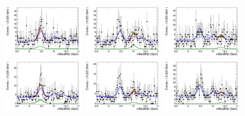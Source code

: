 \begin{figure}[!htbp]
\begin{center}
 \includegraphics[width=0.3\textwidth]{figures/modeling_xchecks/plots/ZToUpsilon1SPhoton_Cat0_signalStrenght_20/Cat0_mMuMNU_fit_s}
\includegraphics[width=0.3\textwidth]{figures/modeling_xchecks/plots/ZToUpsilon2SPhoton_Cat0_signalStrenght_20/Cat0_mMuMNU_fit_s}
\includegraphics[width=0.3\textwidth]{figures/modeling_xchecks/plots/ZToUpsilon3SPhoton_Cat0_signalStrenght_20/Cat0_mMuMNU_fit_s}
\includegraphics[width=0.3\textwidth]{figures/modeling_xchecks/plots/ZToUpsilon1SPhoton_Cat0_signalStrenght_50/Cat0_mMuMNU_fit_s}
\includegraphics[width=0.3\textwidth]{figures/modeling_xchecks/plots/ZToUpsilon2SPhoton_Cat0_signalStrenght_50/Cat0_mMuMNU_fit_s}
\includegraphics[width=0.3\textwidth]{figures/modeling_xchecks/plots/ZToUpsilon3SPhoton_Cat0_signalStrenght_50/Cat0_mMuMNU_fit_s}

\end{center}
\end{figure}

